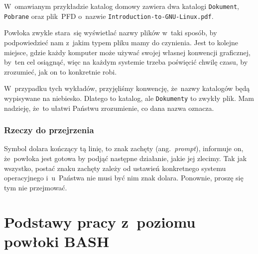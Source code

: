 \documentclass[10pt,t]{beamer}
\begin{document}
\begin{frame}
  W~omawianym przykładzie katalog domowy zawiera dwa katalogi
  \texttt{Dokument}, \texttt{Pobrane} oraz plik~PFD o~nazwie
  \texttt{Introduction-to-GNU-Linux.pdf}.

  Powłoka zwykle stara~się wyświetlać nazwy plików w~taki sposób, by
  podpowiedzieć nam z~jakim typem pliku mamy do czynienia. Jest to kolejne
  miejsce, gdzie każdy komputer może używać swojej własnej konwencji
  graficznej, by~ten cel osiągnąć, więc na każdym systemie trzeba poświęcić
  chwilę czasu, by zrozumieć, jak on to konkretnie robi.

  W~przypadku tych wykładów, przyjęliśmy konwencję, że~nazwy katalogów
  będą wypisywane na niebiesko. Dlatego \texttt{}
  to katalog, ale \texttt{Dokumenty} to zwykły plik. Mam nadzieję, że~to
  ułatwi Państwu zrozumienie, co dana nazwa oznacza.

\end{frame}





\begin{frame}
  \frametitle{Rzeczy do przejrzenia}


  Symbol dolara kończący tą linię, to znak zachęty (ang.~\textit{prompt}),
  informuje on, że~powłoka jest gotowa by podjąć następne działanie, jakie
  jej zlecimy. Tak jak wszystko, postać znaku zachęty zależy od ustawień
  konkretnego systemu operacyjnego i~u~Państwa nie musi być nim znak dolara.
  Ponownie, proszę się tym nie przejmować.

\end{frame}
























\section{Podstawy pracy z~poziomu powłoki BASH}
\end{document}
